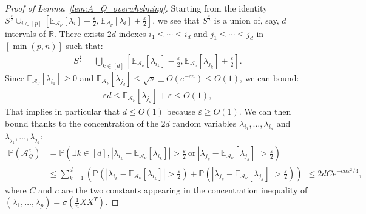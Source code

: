 \documentclass[a4papaer, titlepage]{book}
\begin{document}
\begin{proof}[Proof of Lemma~\ref{lem:A_Q_overwhelming}]
  Starting from the identity $S^{\frac{\varepsilon}{2}} \cup_{i \in [p]} \left[\mathbb E_{\mathcal A_\nu}[\lambda_i] - {\frac{\varepsilon}{2}}, \mathbb E_{\mathcal A_\nu}[\lambda_i] + \frac{\varepsilon}2\right]$, we see that $S^{\frac{\varepsilon}{2}}$ is a union of, say, $d$ intervals of $\mathbb R$. 
  There exists $2d$ indexes $i_{1}\leq\cdots \leq  i_d$ and $j_1 \leq \cdots \leq j_d$ in $[\min(p,n)]$  such that:
  \begin{align*}
    S^{\frac{\varepsilon}{2}} = \bigcup_{k \in[d]} \left[\mathbb E_{\mathcal A_\nu}[\lambda_{i_k}] - {\frac{\varepsilon}{2}}, \mathbb E_{\mathcal A_\nu}[\lambda_{j_k}] + {\frac{\varepsilon}{2}}\right].
  \end{align*}
  Since $\mathbb E_{\mathcal A_\nu}[\lambda_{i_1}] \geq 0$ and $\mathbb E_{\mathcal A_\nu}[\lambda_{j_d}] \leq \sqrt{\nu} \pm O(e^{-cn}) \leq O(1)$, we can bound:
  \begin{align*}
    \varepsilon d \leq \mathbb E_{\mathcal A_\nu}[\lambda_{j_d}] + \varepsilon \leq O(1),
  \end{align*}
  That implies in particular that $d \leq O(1)$ because $\varepsilon \geq O(1)$.
  We can then bound thanks to the concentration of the $2d$ random variables $\lambda_{i_1},\ldots, \lambda_{i_d}$ and $\lambda_{j_1},\ldots, \lambda_{j_d}$:
  \begin{align*}
    \mathbb P(\mathcal A_Q^c) 
    &= \mathbb P \left(\exists k \in [d], \left\vert \lambda_{i_k} - \mathbb E_{\mathcal A_\nu}[\lambda_{i_k}]\right\vert > {\frac{\varepsilon}{2}} \ \text{or} \ \left\vert \lambda_{j_k} - \mathbb E_{\mathcal A_\nu}[\lambda_{j_k}]\right\vert > {\frac{\varepsilon}{2}}\right)\\
    &\leq \sum_{k=1}^d \left( \mathbb P \left( \left\vert \lambda_{i_k} - \mathbb E_{\mathcal A_\nu}[\lambda_{i_k}]\right\vert > {\frac{\varepsilon}{2}}\right) + \mathbb P \left( \left\vert \lambda_{j_k} - \mathbb E_{\mathcal A_\nu}[\lambda_{j_k}]\right\vert > {\frac{\varepsilon}{2}}\right) \right)
    \ \ \leq 2dC e^{- cn \varepsilon^2/4},
  \end{align*}
  where $C$ and $c$ are the two constants appearing in the concentration inequality of $(\lambda_1,\ldots, \lambda_p) = \sigma(\frac{1}{n}XX^T)$.
\end{proof}
\end{document}
